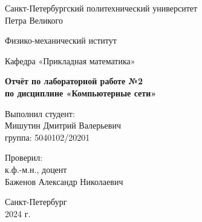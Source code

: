 \begin{titlepage}
  \begin{center}
    {\large Санкт-Петербургский политехнический университет\\Петра Великого\\}
  \end{center}

  \begin{center}
    {\large Физико-механический иститут}
  \end{center}


  \begin{center}
    {\large Кафедра «Прикладная математика»}
  \end{center}

  \vspace{8em}

  \begin{center}
    {\bfseries Отчёт по лабораторной работе №2 \\по дисциплине «Компьютерные сети»}
  \end{center}

  \vspace{5em}

  \begin{flushleft}
    \hspace{16em}Выполнил студент:\\\hspace{16em}Мишутин Дмитрий Валерьевич\\\hspace{16em}группа: 5040102/20201

    \vspace{2em}

    \hspace{16em}Проверил:\\\hspace{16em}к.ф.-м.н., доцент\\\hspace{16em}Баженов Александр Николаевич

  \end{flushleft}


  \vspace{6em}


  \begin{center}
    Санкт-Петербург\\2024 г.
  \end{center}

\end{titlepage}
